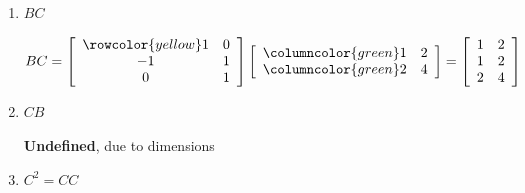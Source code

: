 \documentclass[../../Main.tex]{subfiles}
\begin{document}
\begin{example}
\begin{enumerate}
        \item
        {
            $BC$

            \begin{solution}
                \[
                BC = 
                \left[
                    \begin{array}{cc}
                        \rowcolor{yellow} 1 & 0 \\
                        -1 & 1 \\
                        0 & 1 \\
                    \end{array}
                \right]
                \left[
                    \begin{array}{>{\columncolor{green}}c c}
                        1 & 2 \\
                        2 & 4 \\
                    \end{array}
                \right]
                =
                \left[
                    \begin{array}{cc}
                        1 & 2 \\
                        1 & 2 \\
                        2 & 4 \\
                    \end{array}
                \right]
                \]
            \end{solution}
        }

        \item
        {
            $CB$

            \begin{solution}
                \textbf{Undefined}, due to dimensions
            \end{solution}
        }

        \item
        {
            $C^2 = CC$

}
\end{enumerate}
\end{example}
\end{document}
